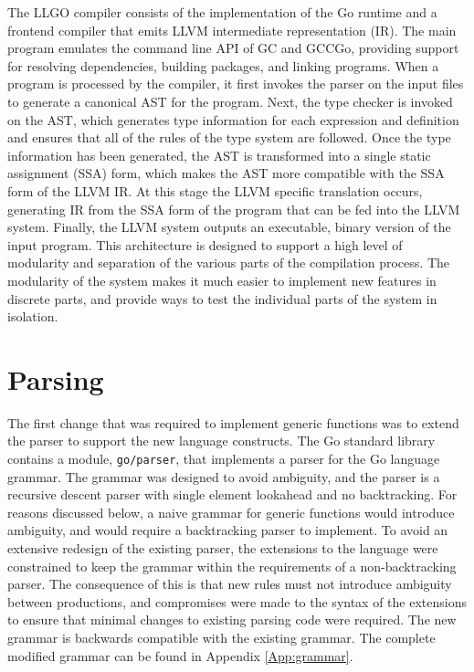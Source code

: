 \documentclass[letterpaper,11pt]{article}
\begin{document}
The LLGO compiler consists of the implementation of the Go runtime and a frontend compiler that emits LLVM intermediate representation (IR). The main program emulates the command line API of GC and GCCGo, providing support for resolving dependencies, building packages, and linking programs. When a program is processed by the compiler, it first invokes the parser on the input files to generate a canonical AST for the program. Next, the type checker is invoked on the AST, which generates type information for each expression and definition and ensures that all of the rules of the type system are followed. Once the type information has been generated, the AST is transformed into a single static assignment (SSA) \cite{ssa} form, which makes the AST more compatible with the SSA form of the LLVM IR. At this stage the LLVM specific translation occurs, generating IR from the SSA form of the program that can be fed into the LLVM system. Finally, the LLVM system outputs an executable, binary version of the input program. This architecture is designed to support a high level of modularity and separation of the various parts of the compilation process. The modularity of the system makes it much easier to implement new features in discrete parts, and provide ways to test the individual parts of the system in isolation.

\section{Parsing} \label{parsing}

The first change that was required to implement generic functions was to extend the parser to support the new language constructs. The Go standard library contains a module, \texttt{go/parser}, that implements a parser for the Go language grammar. The grammar was designed to avoid ambiguity, and the parser is a recursive descent parser with single element lookahead and no backtracking. For reasons discussed below, a naive grammar for generic functions would introduce ambiguity, and would require a backtracking parser to implement. To avoid an extensive redesign of the existing parser, the extensions to the language were constrained to keep the grammar within the requirements of a non-backtracking parser. The consequence of this is that new rules must not introduce ambiguity between productions, and compromises were made to the syntax of the extensions to ensure that minimal changes to existing parsing code were required. The new grammar is backwards compatible with the existing grammar. The complete modified grammar can be found in Appendix \ref{App:grammar}.
\end{document}
